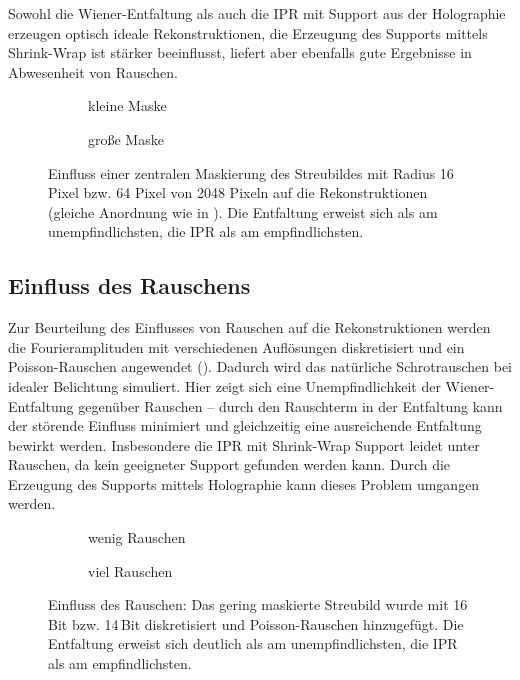 Sowohl die Wiener-Entfaltung als auch die IPR mit Support aus der Holographie erzeugen optisch ideale Rekonstruktionen, die Erzeugung des Supports mittels Shrink-Wrap ist stärker beeinflusst, liefert aber ebenfalls gute Ergebnisse in Abwesenheit von Rauschen.
\begin{figure}
	\begin{subfigure}[b]{0.48\textwidth}
		\caption{kleine Maske}
	\end{subfigure}
	\hspace*{\fill}
	\begin{subfigure}[b]{0.48\textwidth}
		\caption{große Maske}	
	\end{subfigure}
	\caption[2D Rekonstruktion: Beamstop]{Einfluss einer zentralen Maskierung des Streubildes mit Radius 16 Pixel bzw. 64 Pixel von 2048 Pixeln auf die Rekonstruktionen (gleiche Anordnung wie in ). Die Entfaltung erweist sich als am unempfindlichsten, die IPR als am empfindlichsten.}
	\label{fig:recon2d-mask}
\end{figure}

\subsection{Einfluss des Rauschens}
Zur Beurteilung des Einflusses von Rauschen auf die Rekonstruktionen werden die Fourieramplituden mit verschiedenen Auflösungen diskretisiert und ein Poisson-Rauschen angewendet (). Dadurch wird das natürliche Schrotrauschen bei idealer Belichtung simuliert. Hier zeigt sich eine Unempfindlichkeit der Wiener-Entfaltung gegenüber Rauschen -- durch den Rauschterm in der Entfaltung kann der störende Einfluss minimiert und gleichzeitig eine ausreichende Entfaltung bewirkt werden. Insbesondere die IPR mit Shrink-Wrap Support leidet unter Rauschen, da kein geeigneter Support gefunden werden kann. Durch die Erzeugung des Supports mittels Holographie kann dieses Problem umgangen werden.
\begin{figure}
	\begin{subfigure}[b]{0.45\textwidth}
		\caption{wenig Rauschen}
	\end{subfigure}
	\hspace*{\fill}
	\begin{subfigure}[b]{0.45\textwidth}
		\caption{viel Rauschen}	
	\end{subfigure}
	\caption[2D Rekonstruktion: Rauschen]{Einfluss des Rauschen: Das gering maskierte Streubild wurde mit 16\,Bit bzw. 14\,Bit diskretisiert und Poisson-Rauschen hinzugefügt. Die Entfaltung erweist sich deutlich als am unempfindlichsten, die IPR als am empfindlichsten.}
	\label{fig:recon2d-noise}
\end{figure}
